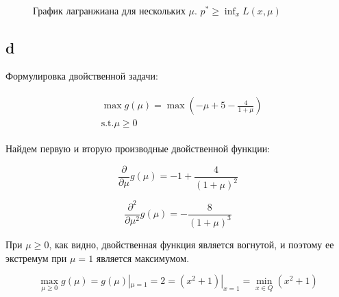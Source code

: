 	\begin{figure}[H]
		\\
		\caption{График лагранжиана для нескольких	$\mu$. $p^{*} \geqslant \inf_{x} L(x, \mu)$}
	\end{figure}
	

	
	\subsection{d}
	Формулировка двойственной задачи:
	
	\begin{align}
	\begin{aligned}
	&\max g(\mu) = \max (-\mu + 5 - \frac{4}{1+\mu})  \\
	&\text{s.t.}\mu \geqslant 0
	\end{aligned}
	\end{align}
	
	Найдем первую и вторую производные двойственной функции:
	
	\begin{equation}
	\frac{\partial}{\partial \mu} g(\mu) = -1 + \frac{4}{(1+\mu)^2}
	\end{equation}
	
	\begin{equation}
	\frac{\partial^2}{\partial \mu^2} g(\mu) = -\frac{8}{(1+\mu)^3}
	\end{equation}
	
	При $\mu \geqslant 0$, как видно, двойственная функция является вогнутой, и поэтому ее экстремум при $\mu = 1$ является максимумом.
	
	\begin{equation}
	\max_{\mu \geqslant 0} g(\mu) = g(\mu)|_{\mu=1} = 2 = (x^2+1)|_{x=1} =\min_{x \in Q} (x^2+1)
	\end{equation}
	
